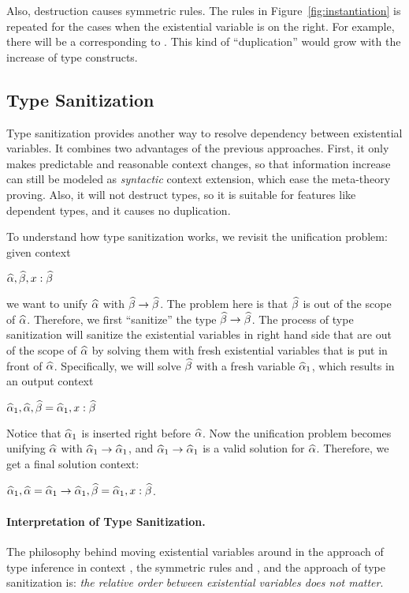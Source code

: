 Also, destruction causes symmetric rules. The rules in
Figure~\ref{fig:instantiation} is repeated for the cases when the existential
variable is on the right. For example, there will be a 
corresponding to . This kind of ``duplication'' would grow with
the increase of type constructs.

\subsection{Type Sanitization}
\label{subsec:sanitization}

Type sanitization provides another way to resolve dependency between existential
variables. It combines two advantages of the previous approaches. First, it only
makes predictable and reasonable context changes, so that information increase
can still be modeled as \textit{syntactic} context extension, which ease the
meta-theory proving. Also, it will not destruct types, so it is suitable for
features like dependent types, and it causes no duplication.

To understand how type sanitization works, we revisit the unification
problem: given context

$\widehat{\alpha}, \widehat{\beta}, x: \widehat{\beta}$

\noindent we want to unify $\widehat{\alpha}$ with $\widehat{\beta} \to \widehat{\beta}$. The problem here is
that $\widehat{\beta}$ is out of the scope of $\widehat{\alpha}$. Therefore, we first ``sanitize''
the type $\widehat{\beta} \to \widehat{\beta}$. The process of type sanitization will sanitize the
existential variables in right hand side that are out of the scope of $\widehat{\alpha}$ by
solving them with fresh existential variables that is put in front of $\widehat{\alpha}$.
Specifically, we will solve
$\widehat{\beta}$ with a fresh variable $\widehat{\alpha}_1$, which results in an output context

$\widehat{\alpha}_1, \widehat{\alpha}, \widehat{\beta} = \widehat{\alpha}_1, x: \widehat{\beta}$

Notice that $\widehat{\alpha}_1$ is inserted right before $\widehat{\alpha}$. Now the unification
problem becomes unifying $\widehat{\alpha}$ with $\widehat{\alpha}_1 \to \widehat{\alpha}_1$, and $\widehat{\alpha}_1 \to
\widehat{\alpha}_1$ is a valid solution for $\widehat{\alpha}$. Therefore, we get a final solution
context:

$\widehat{\alpha}_1, \widehat{\alpha} = \widehat{\alpha}_1 \to \widehat{\alpha}_1, \widehat{\beta} = \widehat{\alpha}_1, x : \widehat{\beta}$.

\paragraph{Interpretation of Type Sanitization.}
The philosophy behind moving existential variables around in the approach of
type inference in context \citep{gundry2010type}, the symmetric rules
 and  \citep{dunfield2013complete}, and the
approach of type sanitization is: \textit{the relative order between existential
  variables does not matter}.

